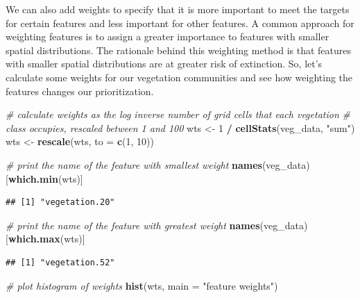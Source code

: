 \documentclass[12pt,]{book}
\newenvironment{Shaded}{\begin{snugshade}}{\end{snugshade}}
\newcommand{\KeywordTok}[1]{\textcolor[rgb]{0.13,0.29,0.53}{\textbf{#1}}}
\newcommand{\DataTypeTok}[1]{\textcolor[rgb]{0.13,0.29,0.53}{#1}}
\newcommand{\DecValTok}[1]{\textcolor[rgb]{0.00,0.00,0.81}{#1}}
\newcommand{\StringTok}[1]{\textcolor[rgb]{0.31,0.60,0.02}{#1}}
\newcommand{\CommentTok}[1]{\textcolor[rgb]{0.56,0.35,0.01}{\textit{#1}}}
\newcommand{\OperatorTok}[1]{\textcolor[rgb]{0.81,0.36,0.00}{\textbf{#1}}}
\newcommand{\NormalTok}[1]{#1}
\begin{document}
We can also add weights to specify that it is more important to meet the
targets for certain features and less important for other features. A
common approach for weighting features is to assign a greater importance
to features with smaller spatial distributions. The rationale behind
this weighting method is that features with smaller spatial
distributions are at greater risk of extinction. So, let's calculate
some weights for our vegetation communities and see how weighting the
features changes our prioritization.

\begin{Shaded}
\begin{Highlighting}[]
\CommentTok{# calculate weights as the log inverse number of grid cells that each vegetation}
\CommentTok{# class occupies, rescaled between 1 and 100}
\NormalTok{wts <-}\StringTok{ }\DecValTok{1} \OperatorTok{/}\StringTok{ }\KeywordTok{cellStats}\NormalTok{(veg_data, }\StringTok{"sum"}\NormalTok{)}
\NormalTok{wts <-}\StringTok{ }\KeywordTok{rescale}\NormalTok{(wts, }\DataTypeTok{to =} \KeywordTok{c}\NormalTok{(}\DecValTok{1}\NormalTok{, }\DecValTok{10}\NormalTok{))}

\CommentTok{# print the name of the feature with smallest weight}
\KeywordTok{names}\NormalTok{(veg_data)[}\KeywordTok{which.min}\NormalTok{(wts)]}
\end{Highlighting}
\end{Shaded}

\begin{verbatim}
## [1] "vegetation.20"
\end{verbatim}

\begin{Shaded}
\begin{Highlighting}[]
\CommentTok{# print the name of the feature with greatest weight}
\KeywordTok{names}\NormalTok{(veg_data)[}\KeywordTok{which.max}\NormalTok{(wts)]}
\end{Highlighting}
\end{Shaded}

\begin{verbatim}
## [1] "vegetation.52"
\end{verbatim}

\begin{Shaded}
\begin{Highlighting}[]
\CommentTok{# plot histogram of weights}
\KeywordTok{hist}\NormalTok{(wts, }\DataTypeTok{main =} \StringTok{"feature weights"}\NormalTok{)}
\end{Highlighting}
\end{Shaded}
\end{document}
